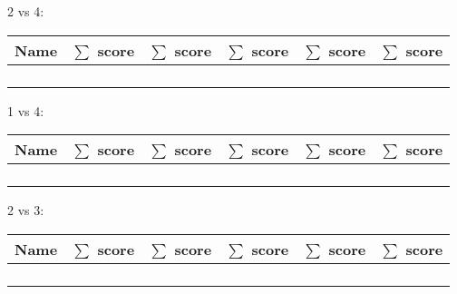 \documentclass{article}
\begin{document}
\begin{center}
    2 vs 4: 
    \begin{tabular}{r|c|c|c|c|c}
        \toprule
        Name     & \(\sum\) score & \(\sum\) score & \(\sum\) score & \(\sum\) score & \(\sum\) score\\
        \midrule
                 &                &                &                &                & \\
                 &                &                &                &                & \\
        \midrule
                 &                &                &                &                & \\
                 &                &                &                &                & \\
        \bottomrule
    \end{tabular}
\end{center}

\begin{center}
    1 vs 4: 
    \begin{tabular}{r|c|c|c|c|c}
        \toprule
        Name     & \(\sum\) score & \(\sum\) score & \(\sum\) score & \(\sum\) score & \(\sum\) score\\
        \midrule
                 &                &                &                &                & \\
                 &                &                &                &                & \\
        \midrule
                 &                &                &                &                & \\
                 &                &                &                &                & \\
        \bottomrule
    \end{tabular}
\end{center}

\begin{center}
    2 vs 3: 
    \begin{tabular}{r|c|c|c|c|c}
        \toprule
        Name     & \(\sum\) score & \(\sum\) score & \(\sum\) score & \(\sum\) score & \(\sum\) score\\
        \midrule
                 &                &                &                &                & \\
                 &                &                &                &                & \\
        \midrule
                 &                &                &                &                & \\
                 &                &                &                &                & \\
        \bottomrule
    \end{tabular}
\end{center}
\end{document}
